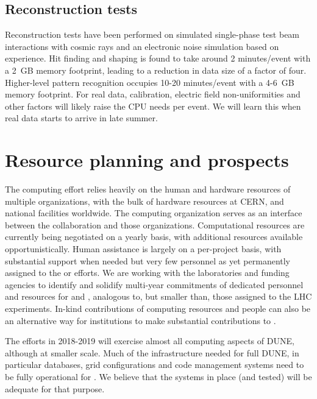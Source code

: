 \subsection{Reconstruction tests}
Reconstruction tests have been performed on simulated  single-phase  test beam interactions with cosmic rays and an electronic noise simulation based on  experience.  Hit finding and shaping is found to take around 2 minutes/event with a 2~GB memory footprint, leading to a reduction in data size of a factor of four.  Higher-level pattern recognition occupies 10-20 minutes/event with a 4-6~GB memory footprint.  For real data, calibration, electric field non-uniformities and other factors will likely raise the CPU needs per event. We will learn this when real data starts to arrive in late summer. 


\section{Resource planning and prospects}



The   computing effort  relies heavily on the human and hardware resources of  multiple organizations,  with the bulk of hardware resources at CERN, and national facilities worldwide.  The    computing organization serves as an interface between the collaboration and those organizations.  Computational resources are currently being negotiated on a yearly basis, with additional resources available opportunistically. Human assistance is largely on a per-project  basis, with substantial support when needed but very few personnel as yet permanently assigned to the   or  efforts.  We are working with the laboratories and funding agencies to identify and solidify multi-year commitments of dedicated personnel and resources for  and , analogous to, but smaller than, those assigned to the LHC experiments.   In-kind contributions of computing resources and people can also  be an alternative way for institutions to make substantial contributions to .

The  efforts in 2018-2019 will exercise almost all computing aspects of DUNE, although at smaller scale.  Much of the infrastructure needed for full DUNE, in particular  databases, grid configurations and code management systems need to be fully operational  for .   We believe that the systems in place (and tested) will be adequate for that purpose.

